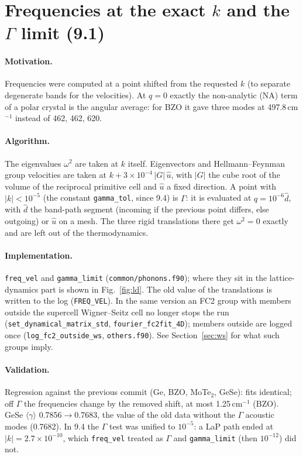 \documentclass[11pt,a4paper]{article}
\newcommand{\code}[1]{\texttt{#1}}
\begin{document}
\section{\texorpdfstring{Frequencies at the exact $k$ and the $\Gamma$ limit (9.1)}{Frequencies at the exact k and the Gamma limit (9.1)}}\label{sec:freq}
\paragraph{Motivation.} Frequencies were computed at a point shifted from the requested $k$ (to separate
degenerate bands for the velocities). At $q=0$ exactly the non-analytic (NA) term of a polar crystal is
the angular average: for BZO it gave three modes at 497.8\,cm$^{-1}$ instead of 462, 462, 620.

\paragraph{Algorithm.} The eigenvalues $\omega^2$ are taken at $k$ itself. Eigenvectors and
Hellmann--Feynman group velocities are taken at $k+3\times10^{-4}\,|G|\,\hat u$, with $|G|$ the cube root of
the volume of the reciprocal primitive cell and $\hat u$ a fixed direction. A point with $|k|<10^{-5}$
(the constant \code{gamma\_tol}, since 9.4) is $\Gamma$: it is evaluated at $q=10^{-6}\hat d$, with $\hat d$
the band-path segment (incoming if the previous point differs, else outgoing) or $\hat u$ on a mesh. The
three rigid translations there get $\omega^2=0$ exactly and are left out of the thermodynamics.

\paragraph{Implementation.} \code{freq\_vel} and \code{gamma\_limit} (\code{common/phonons.f90}); where they sit in the
lattice-dynamics part is shown in Fig.~\ref{fig:ld}. The old
value of the translations is written to the log (\code{FREQ\_VEL}). In the same version an FC2 group with
members outside the supercell Wigner--Seitz cell no longer stops the run
(\code{set\_dynamical\_matrix\_std}, \code{fourier\_fc2fit\_4D}); members outside are logged once
(\code{log\_fc2\_outside\_ws}, \code{others.f90}). See Section~\ref{sec:ws} for what such groups imply.

\paragraph{Validation.} Regression against the previous commit (Ge, BZO, MoTe$_2$, GeSe): fits identical;
off $\Gamma$ the frequencies change by the removed shift, at most 1.25\,cm$^{-1}$ (BZO). GeSe
$\langle\gamma\rangle$ 0.7856$\to$0.7683, the value of the old data without the $\Gamma$ acoustic modes
(0.7682). In 9.4 the $\Gamma$ test was unified to $10^{-5}$: a LaP path ended at $|k|=2.7\times10^{-10}$,
which \code{freq\_vel} treated as $\Gamma$ and \code{gamma\_limit} (then $10^{-12}$) did not.
\end{document}

